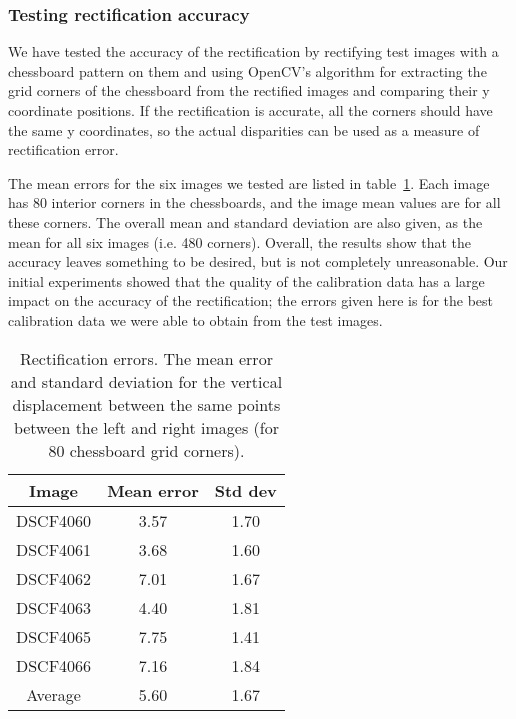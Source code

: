 \subsubsection{Testing rectification accuracy}
We have tested the accuracy of the rectification by rectifying test images with
a chessboard pattern on them and using OpenCV's algorithm for extracting the
grid corners of the chessboard from the rectified images and comparing their y
coordinate positions. If the rectification is accurate, all the corners should
have the same y coordinates, so the actual disparities can be used as a measure
of rectification error.

The mean errors for the six images we tested are listed in
table~\ref{tab:rectification-error}. Each image has 80 interior corners in the
chessboards, and the image mean values are for all these corners. The overall
mean and standard deviation are also given, as the mean for all six images (i.e.
480 corners). Overall, the results show that the accuracy leaves something to be
desired, but is not completely unreasonable. Our initial experiments showed that
the quality of the calibration data has a large impact on the accuracy of the
rectification; the errors given here is for the best calibration data we were
able to obtain from the test images.

\begin{table}[h]
  \centering
  \begin{tabular}{c c c}
    \toprule
    Image & Mean error & Std dev \\
    \midrule
    DSCF4060 & 3.57  & 1.70 \\
    DSCF4061 & 3.68  & 1.60 \\
    DSCF4062 & 7.01  & 1.67 \\
    DSCF4063 & 4.40  & 1.81 \\
    DSCF4065 & 7.75  & 1.41 \\
    DSCF4066 & 7.16  & 1.84 \\
    \midrule
    Average  & 5.60  & 1.67 \\
    \bottomrule
  \end{tabular}
  \caption[Rectification errors]{Rectification errors. The mean error and
    standard deviation for the vertical displacement between the same points
    between the left and right images (for 80 chessboard grid corners).}
  \label{tab:rectification-error}
\end{table}

